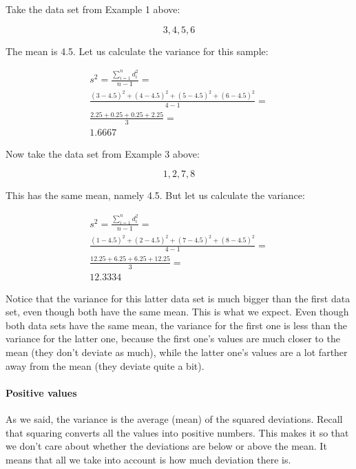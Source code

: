 \documentclass[../../../main.tex]{subfiles}
\begin{document}
Take the data set from Example 1 above:

\begin{equation*}
  3, 4, 5, 6
\end{equation*}

\noindent
The mean is 4.5. Let us calculate the variance for this sample:

\begin{align*}
  s^{2} = \frac{\sum\limits_{i=1}^{n} d^{2}_{i} }{n - 1} = \\
  \frac{(3 - 4.5)^{2} + (4 - 4.5)^{2} + (5 - 4.5)^{2} + (6 - 4.5)^{2}}{4 - 1} = \\
  \frac{2.25 + 0.25 + 0.25 + 2.25}{3} = \\
  1.6667
\end{align*}

\noindent
Now take the data set from Example 3 above:

\begin{equation*}
  1, 2, 7, 8
\end{equation*}

\noindent
This has the same mean, namely 4.5. But let us calculate the variance:

\begin{align*}
  s^{2} = \frac{\sum\limits_{i=1}^{n} d^{2}_{i} }{n - 1} = \\
  \frac{(1 - 4.5)^{2} + (2 - 4.5)^{2} + (7 - 4.5)^{2} + (8 - 4.5)^{2}}{4 - 1} = \\
  \frac{12.25 + 6.25 + 6.25 + 12.25}{3} = \\
  12.3334
\end{align*}

\noindent
Notice that the variance for this latter data set is much bigger than the first data set, even though both have the same mean. This is what we expect. Even though both data sets have the same mean, the variance for the first one is less than the variance for the latter one, because the first one's values are much closer to the mean (they don't deviate as much), while the latter one's values are a lot farther away from the mean (they deviate quite a bit). 


\paragraph{Positive values}

As we said, the variance is the average (mean) of the squared deviations. Recall that squaring converts all the values into positive numbers. This makes it so that we don't care about whether the deviations are below or above the mean. It means that all we take into account is how much deviation there is.
\end{document}
